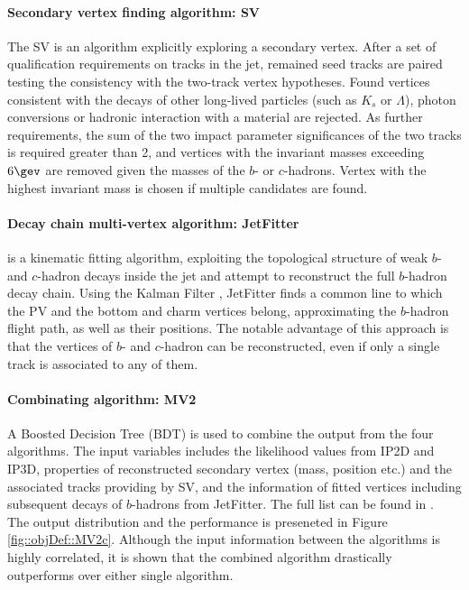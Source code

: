 \paragraph{Secondary vertex finding algorithm: SV}
The SV is an algorithm \cite{152_SV} explicitly exploring a secondary vertex. 
After a set of qualification requirements on tracks in the jet, remained seed tracks are paired testing the consistency with the two-track vertex hypotheses. Found vertices consistent with the decays of other long-lived particles (such as $K_s$ or $\Lambda$), photon conversions or hadronic interaction with a material are rejected. As further requirements, the sum of the two impact parameter significances of the two tracks is required greater than 2, and vertices with the invariant masses exceeding $6 \gev$ are removed given the masses of the $b$- or $c$-hadrons. 
Vertex with the highest invariant mass is chosen if multiple candidates are found. %


\paragraph{Decay chain multi-vertex algorithm: JetFitter}
 \cite{153_JetFitter} is a kinematic fitting algorithm, exploiting the topological structure of weak $b$- and $c$-hadron decays inside the jet and attempt to reconstruct the full $b$-hadron decay chain. Using the Kalman Filter \cite{133_KalmanFitter}, JetFitter finds a common line to which the PV and the bottom and charm vertices belong, approximating the $b$-hadron flight path, as well as their positions. The notable advantage of this approach is that the vertices of $b$- and $c$-hadron can be reconstructed, even if only a single track is associated to any of them.

\paragraph{Combinating algorithm: MV2 }
A Boosted Decision Tree (BDT) is used to combine the output from the four algorithms.
The input variables includes
the likelihood values from IP2D and IP3D,
properties of reconstructed secondary vertex (mass, position etc.) and the associated tracks providing by SV,
and the information of fitted vertices including subsequent decays of $b$-hadrons from JetFitter.
The full list can be found in \cite{150_bTag_Run2_exp}. \\

The output distribution and the performance is preseneted in Figure \ref{fig::objDef::MV2c}.
Although the input information between the algorithms is highly correlated, 
it is shown that the combined algorithm drastically outperforms over either single algorithm. \\


